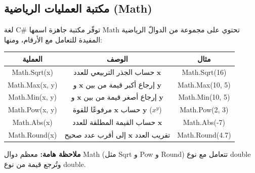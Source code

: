 \documentclass[14pt]{extarticle}
\begin{document}
\clearpage

\subsection{مكتبة العمليات الرياضية (\textenglish{Math})}

لغة \textenglish{C\#} توفّر مكتبة جاهزة اسمها \textenglish{Math} تحتوي على مجموعة من الدوالّ الرياضية المفيدة للتعامل مع الأرقام، ومنها:

\begin{center}
\begin{tabular}{|c|c|c|}
\hline
العملية & الوصف & مثال \\
\hline
\textenglish{Math.Sqrt(x)} & حساب الجذر التربيعي للعدد $\mathbf{x}$ & \textenglish{Math.Sqrt(16)} \\
\hline
\textenglish{Math.Max(x, y)} & إرجاع أكبر قيمة من بين $\mathbf{x}$ و $\mathbf{y}$ & \textenglish{Math.Max(10, 5)} \\
\hline
\textenglish{Math.Min(x, y)} & إرجاع أصغر قيمة من بين $\mathbf{x}$ و $\mathbf{y}$ & \textenglish{Math.Min(10, 5)} \\
\hline
\textenglish{Math.Pow(x, y)} & حساب $\mathbf{x}$ مرفوعًا للقوة $\mathbf{y}$ ($x^y$) & \textenglish{Math.Pow(2, 3)} \\
\hline
\textenglish{Math.Abs(x)} & حساب القيمة المطلقة للعدد $\mathbf{x}$ & \textenglish{Math.Abs(-7)} \\
\hline
\textenglish{Math.Round(x)} & تقريب العدد $\mathbf{x}$ إلى أقرب عدد صحيح & \textenglish{Math.Round(4.7)} \\
\hline
\end{tabular}
\end{center}

\textbf{ملاحظة هامة:} معظم دوال \textenglish{Math} (مثل \textenglish{Sqrt} و \textenglish{Pow} و \textenglish{Round}) تتعامل مع نوع \textenglish{double} وتُرجع قيمة من نوع \textenglish{double}.
\end{document}
